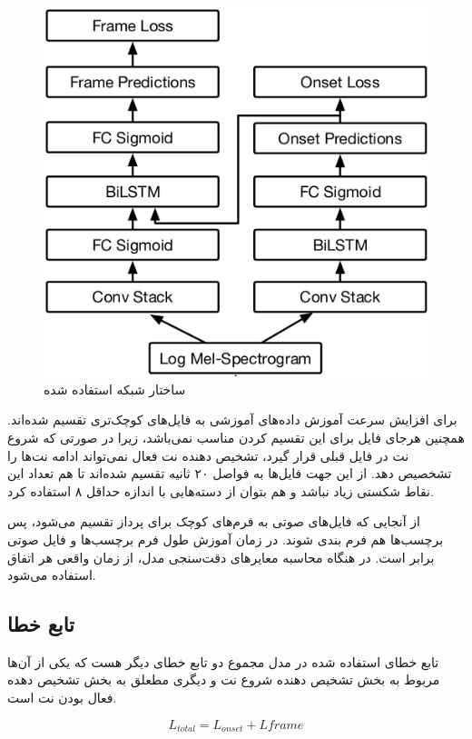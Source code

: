 \begin{figure}
    \includegraphics[width=\linewidth]
    {./statics/onset_onframe_network_architecture.png}
    \caption{ساختار شبکه استفاده شده}
\end{figure}

برای افزایش سرعت آموزش داده‌های آموزشی به فایل‌های کوچک‌تری تقسیم شده‌اند. همچنین
هرجای فایل برای این تقسیم کردن مناسب نمی‌باشد، زیرا در صورتی که شروع نت در فایل
قبلی قرار گیرد، تشخیص دهنده نت فعال نمی‌تواند ادامه نت‌ها را تشخصیص دهد. از این
جهت فایل‌ها به فواصل ۲۰ ثانیه تقسیم شده‌اند تا هم تعداد این نقاط شکستی زیاد نباشد
و هم بتوان از دسته‌هایی با اندازه حداقل ۸ استفاده کرد.

از آنجایی که فایل‌های صوتی به فرم‌های کوچک برای پرداز تقسیم می‌شود، پس برچسب‌ها هم
فرم بندی شوند. در زمان آموزش طول فرم برچسب‌ها و فایل صوتی برابر است. در هنگاه
محاسبه معایرهای دقت‌سنجی مدل، از زمان واقعی هر اتفاق استفاده می‌شود.

\subsection{تابع خطا}
تابع خطای استفاده شده در مدل مجموع دو تابع خطای دیگر
هست که یکی از آن‌ها مربوط به بخش تشخیص دهنده شروع نت و دیگری مطعلق به بخش تشخیص
دهده فعال بودن نت است.

\begin{equation}
    L_{total} = L_{onset} + L{frame}
\end{equation}

